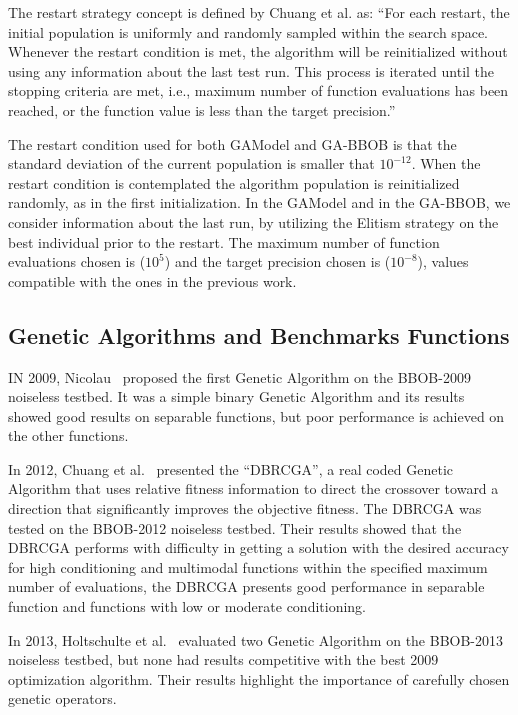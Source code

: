 The restart strategy concept is defined by Chuang et al. as: ``For each restart, the initial population  is uniformly and randomly sampled within the search space. Whenever the restart condition is met, the algorithm will be reinitialized without using any information about the last test run. This process is iterated until the stopping criteria are met, i.e., maximum number of function evaluations has been reached, or the function value is less than the target precision.''

The restart condition used for both GAModel and GA-BBOB is that the standard deviation of the current population is smaller that $10^{-12}$. When the restart condition is contemplated the algorithm population is reinitialized randomly, as in the first initialization. In the GAModel and in the GA-BBOB, we consider information about the last run, by utilizing the Elitism strategy on the best individual prior to the restart. The maximum number of function evaluations chosen is ($10^5$) and the target precision chosen is ($10^{-8}$), values compatible with the ones in the previous work.

\subsection{Genetic Algorithms and Benchmarks Functions}

IN 2009, Nicolau~\cite{nicolau2009application} proposed the first Genetic Algorithm on the BBOB-2009 noiseless testbed. It was a simple binary Genetic Algorithm and its results showed good results on separable functions, but poor performance is achieved on the other functions.

In 2012, Chuang et al.~\cite{chuang2012black} presented the ``DBRCGA'', a real coded Genetic Algorithm that uses relative fitness information to direct the crossover toward a direction that significantly improves the objective fitness. The DBRCGA was tested on the BBOB-2012 noiseless testbed. Their results showed that the DBRCGA performs with difficulty in getting a solution with the desired accuracy for high conditioning and multimodal functions within the specified maximum number of evaluations, the DBRCGA presents good performance in separable function and functions with low or moderate conditioning.

In 2013, Holtschulte et al.~\cite{holtschulte2013benchmarking} evaluated two Genetic Algorithm on the BBOB-2013 noiseless testbed, but none had results competitive with the best 2009 optimization algorithm. Their results highlight the importance of carefully chosen genetic operators.

